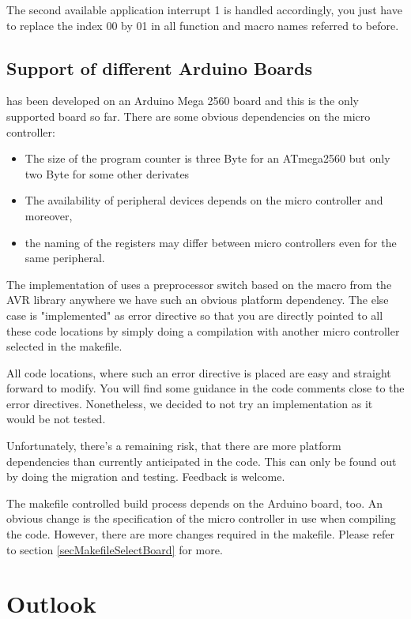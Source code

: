 The second available application interrupt 1 is handled accordingly, you
just have to replace the index 00 by 01 in all function and macro names
referred to before.


\section{Support of different Arduino Boards}
\label{secArduinoBoards}

\rtos{} has been developed on an Arduino Mega 2560 board and this is the
only supported board so far. There are some obvious dependencies on the
micro controller:
\begin{itemize}
  \item The size of the program counter is three Byte for an ATmega2560
    but only two Byte for some other derivates
  \item The availability of peripheral devices depends on the micro controller and
    moreover,
  \item the naming of the registers may differ between micro controllers even for the
    same peripheral.
\end{itemize}
The implementation of \rtos{} uses a preprocessor switch based on the
macro  from the AVR library anywhere we have
such an obvious platform dependency. The else case is "implemented" as
error directive so that you are directly pointed to all these code locations
by simply doing a compilation with another micro controller selected in the makefile.

All code locations, where such an error directive is placed are easy and
straight forward to modify. You will find some guidance in the code
comments close to the error directives. Nonetheless, we decided to not try
an implementation as it would be not tested.

Unfortunately, there's a remaining risk, that there are more platform
dependencies than currently anticipated in the code. This can only be
found out by doing the migration and testing. Feedback is welcome.

The makefile controlled build process depends on the Arduino board, too.
An obvious change is the specification of the micro controller in use when compiling
the code. However, there are more changes required in the makefile. Please
refer to section \ref{secMakefileSelectBoard} for more.


\chapter{Outlook}
\label{secOutlook}

